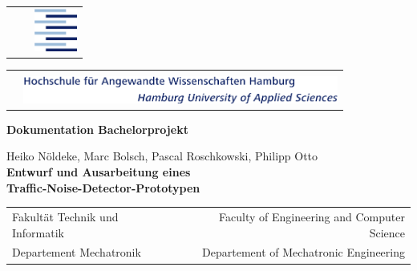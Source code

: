 \newpage
\thispagestyle{empty}
\AddToShipoutPicture*{\BackgroundPic}


\begin{center}

\begin{tabular}{p{3cm}p{8cm}p{4cm}}
&\textcolor{red}{\LARGE{ }} & \vspace{-0.5cm} \includegraphics[height=1.4cm]{Logo_Titelseite_ohne_text.png}\\
\end{tabular}

\begin{tabular}{p{5cm}p{10.5cm}}
&\\
&\includegraphics[height=0.9cm]{Logo_Titelseite_ohne_Symbol.png}\\
\end{tabular}

\end{center}

\vspace{7cm}

\begin{flushright}
\begin{Huge}
\textbf{Dokumentation Bachelorprojekt} \\
\end{Huge}
\vspace{2cm}
\Large{Heiko Nöldeke, Marc Bolsch, Pascal Roschkowski, Philipp Otto} \\
\vspace{0.5cm}
\LARGE{\textbf{Entwurf und Ausarbeitung eines \\ Traffic-Noise-Detector-Prototypen}}
\end{flushright}
\vspace{8cm}

\begin{center}
\begin{tabular}{lp{2cm}r}
Fakultät Technik und Informatik && Faculty of Engineering and Computer Science \\
Departement Mechatronik && Departement of Mechatronic Engineering \\
\end{tabular}
\end{center}

\newpage
\restoregeometry

\ClearShipoutPicture
